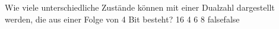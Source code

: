    {Wie viele unterschiedliche Zustände können mit einer Dualzahl dargestellt werden, die aus einer Folge von 4 Bit besteht?}
    {16}
    {4}
    {6}
    {8}
    {false}{false}